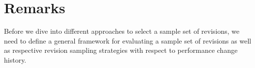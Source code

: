 

\section{Remarks}
Before we dive into different approaches to select a sample set of revisions,
we need to define a general framework for evaluating a sample set of revisions
as well as respective revision sampling strategies with respect to performance
change history.

